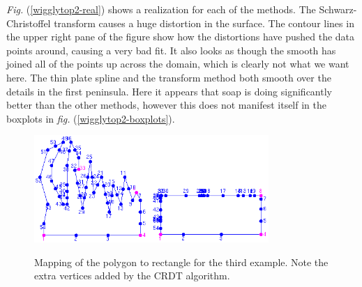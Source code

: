 \documentclass[a4paper,10pt]{amsart}
\newcommand{\sch}{Schwarz-Christoffel }
\newcommand{\fig}[1]{\emph{fig.} (\ref{#1})}
\newcommand{\Fig}[1]{\emph{Fig.} (\ref{#1})}
\begin{document}
\Fig{wigglytop2-real} shows a realization for each of the methods. The \sch transform causes a huge distortion in the surface. The contour lines in the upper right pane of the figure show how the distortions have pushed the data points around, causing a very bad fit. It also looks as though the smooth has joined all of the points up across the domain, which is clearly not what we want here. The thin plate spline and the transform method both smooth over the details in the first peninsula. Here it appears that soap is doing significantly better than the other methods, however this does not manifest itself in the boxplots in \fig{wigglytop2-boxplots}.


\begin{figure}
\centering
\includegraphics[width=3.5in]{figs-otherdomains/wigglytop2-numbered.png} \\
\caption{Mapping of the polygon to rectangle for the third example. Note the extra vertices added by the CRDT algorithm.}
\label{wigglytop2-numbered}
\end{figure}
\end{document}
